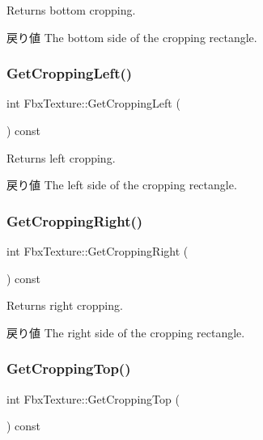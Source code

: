 Returns bottom cropping. \begin{DoxyReturn}{戻り値}
The bottom side of the cropping rectangle. 
\end{DoxyReturn}
\mbox{\label{class_fbx_texture_a8f8e8e8f645cc8cd3f3fabae7e5b6c44}} 
\subsubsection{\texorpdfstring{Get\+Cropping\+Left()}{GetCroppingLeft()}}
{\footnotesize\ttfamily int Fbx\+Texture\+::\+Get\+Cropping\+Left (\begin{DoxyParamCaption}{ }\end{DoxyParamCaption}) const}

Returns left cropping. \begin{DoxyReturn}{戻り値}
The left side of the cropping rectangle. 
\end{DoxyReturn}
\mbox{\label{class_fbx_texture_a4acabeab1c1c4fe031bbd8bd9ace3c64}} 
\subsubsection{\texorpdfstring{Get\+Cropping\+Right()}{GetCroppingRight()}}
{\footnotesize\ttfamily int Fbx\+Texture\+::\+Get\+Cropping\+Right (\begin{DoxyParamCaption}{ }\end{DoxyParamCaption}) const}

Returns right cropping. \begin{DoxyReturn}{戻り値}
The right side of the cropping rectangle. 
\end{DoxyReturn}
\mbox{\label{class_fbx_texture_a1033fe7ba0df6166e17a49d095518c25}} 
\subsubsection{\texorpdfstring{Get\+Cropping\+Top()}{GetCroppingTop()}}
{\footnotesize\ttfamily int Fbx\+Texture\+::\+Get\+Cropping\+Top (\begin{DoxyParamCaption}{ }\end{DoxyParamCaption}) const}

